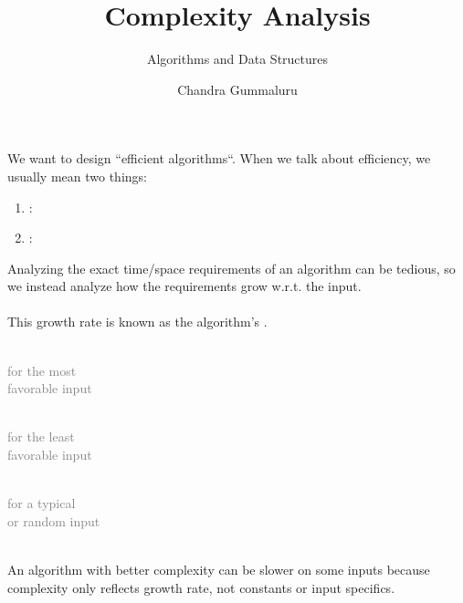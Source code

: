 \documentclass[mathserif, handout]{beamer}
\title{Complexity Analysis}
\subtitle{Algorithms and Data Structures}
\author[C. Gummaluru]{Chandra Gummaluru}
\institute[]{\url{chandra-gummaluru.github.io} }
\date[Algorithms and Data Structures]{}
\begin{document}
\begin{frame}
   \maketitle
\end{frame}

\begin{frame}
We want to design ``efficient algorithms``. When we talk about efficiency, we usually mean two things: \\[4mm]
\begin{enumerate}
\item {}: \\
\item {}: \\
\end{enumerate}
\end{frame}

\begin{frame}
Analyzing the exact time/space requirements of an algorithm can be tedious, so we instead analyze how the requirements grow w.r.t. the input.
\\~\\
This growth rate is known as the algorithm's .
\\[8mm]
\begin{minipage}{0.33\textwidth}
\centering
{} \\[2mm]
\footnotesize\textcolor{gray}{for the most \\ favorable input}
\end{minipage}%
\begin{minipage}{0.33\textwidth}
\centering
{} \\[2mm]
\footnotesize\textcolor{gray}{for the least \\ favorable input}
\end{minipage}%
\begin{minipage}{0.33\textwidth}
\centering
{} \\[2mm]
\footnotesize\textcolor{gray}{for a typical \\ or random input}
\end{minipage}
\\[8mm]
An algorithm with better complexity can be slower on some inputs because complexity only reflects growth rate, not constants or input specifics.
\end{frame}
\end{document}
